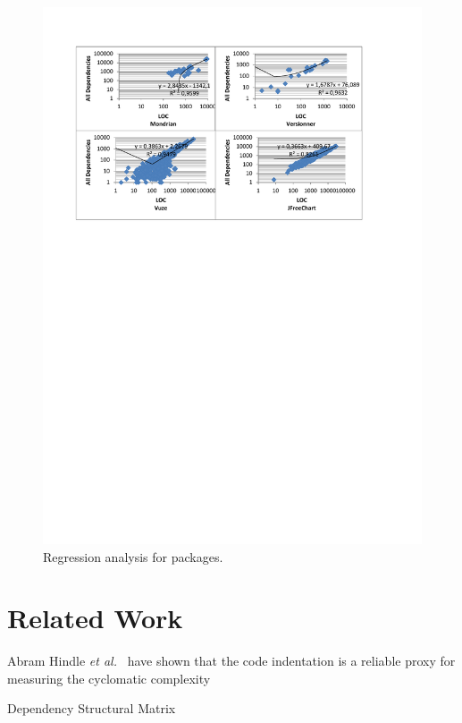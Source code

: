 \documentclass{sig-alternate}
\newcommand{\etal}{\emph{et al.}\xspace}
\newcommand{\figlabel}[1]{\label{fig:#1}}
\begin{document}
\begin{figure}
\includegraphics[bb=50bp 505bp 505bp 785bp,clip]{RegressionAnalysisPackages}

\caption{Regression analysis for packages.\figlabel{Regression-analysis-packages}}


\end{figure}



\section{Related Work}

Abram Hindle \etal~\cite{Hind08a} have shown that the code indentation is a reliable proxy for measuring the cyclomatic complexity

Dependency Structural Matrix~\cite{Sang05a}
\end{document}
